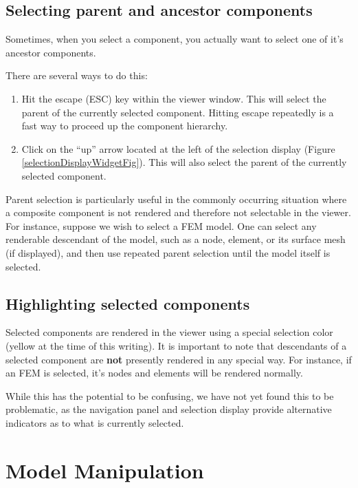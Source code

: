 \documentclass{article}
\begin{document}
\subsection{Selecting parent and ancestor components}
\label{selectingAncestorsSec}

Sometimes, when you select a component, you actually want to select
one of it's ancestor components. 

There are several ways to do this:

\begin{enumerate}

\item Hit the escape ({\sf ESC}) key within the viewer window. This
will select the parent of the currently selected component. Hitting
escape repeatedly is a fast way to proceed up the component hierarchy.

\item Click on the ``up'' arrow located at the left of the selection
display (Figure \ref{selectionDisplayWidgetFig}). This will also
select the parent of the currently selected component.

\end{enumerate}

Parent selection is particularly useful in the commonly occurring
situation where a composite component is not rendered and therefore
not selectable in the viewer. For instance, suppose we wish to select
a FEM model. One can select any renderable descendant of the model,
such as a node, element, or its surface mesh (if displayed), and then
use repeated parent selection until the model itself is selected.

\subsection{Highlighting selected components}

Selected components are rendered in the viewer using a special
selection color (yellow at the time of this writing). It is important
to note that descendants of a selected component are {\bf not} presently
rendered in any special way. For instance, if an FEM is selected, it's
nodes and elements will be rendered normally. 

While this has the potential to be confusing, we have not yet found
this to be problematic, as the navigation panel and selection display
provide alternative indicators as to what is currently selected.

\section{Model Manipulation}
\label{ModelManipulation}
\end{document}
